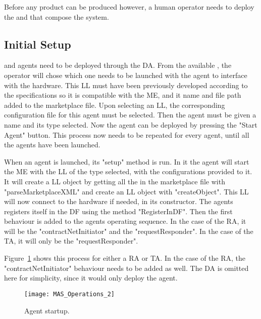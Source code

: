 Before any product can be produced however, a human operator needs to deploy the  and  that compose the system.\\

\subsection{Initial Setup}
\label{subsec:initial_setup}

 and  agents need to be deployed through the \acrshort{DA}. From the available , the operator will chose which one needs to be launched with the agent to interface with the hardware. This \acrshort{LL} must have been previously developed according to the specifications so it is compatible with the \acrlong{ME}, and it name and file path added to the marketplace file. Upon selecting an \acrshort{LL}, the corresponding configuration file for this agent must be selected. Then the agent must be given a name and its type selected. Now the agent can be deployed by pressing the "Start Agent" button. This process now needs to be repeated for every agent, until all the agents have been launched.

When an agent is launched, its "setup" method is run. In it the agent will start the \acrshort{ME} with the \acrshort{LL} of the type selected, with the configurations provided to it. It will create a \acrlong{LL} object by getting all the  in the marketplace file with "parseMarketplaceXML" and create an \acrshort{LL} object with "createObject". This \acrshort{LL} will now connect to the hardware if needed, in its constructor. The agents registers itself in the \acrshort{DF} using the method "RegisterInDF". Then the first behaviour is added to the agents operating sequence. In the case of the \acrshort{RA}, it will be the "contractNetInitiator" and the "requestResponder". In the case of the \acrshort{TA}, it will only be the "requestResponder".

Figure~\ref{fig:mas_operations_2} shows this process for either a \acrlong{RA} or \acrlong{TA}. In the case of the \acrshort{RA}, the "contractNetInitiator" behaviour needs to be added as well. The \acrshort{DA} is omitted here for simplicity, since it would only deploy the agent.

\begin{figure}[h!]
	\centering
	\texttt{[image: MAS\_Operations\_2]}
	\caption{Agent startup.}
	\label{fig:mas_operations_2}
\end{figure}

